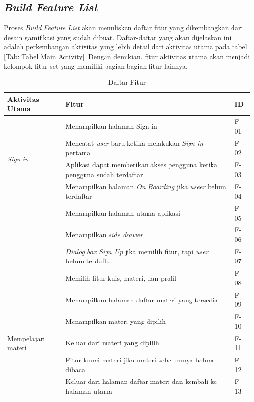 \subsection{\textit{Build Feature List}}
Proses \textit{Build Feature List} akan menuliskan daftar fitur yang dikembangkan dari desain gamifikasi yang sudah dibuat.
Daftar-daftar yang akan dijelaskan ini adalah perkembangan aktivitas yang lebih detail dari aktivitas utama pada tabel \ref*{Tab: Tabel Main Activity}.
Dengan demikian, fitur aktivitas utama akan menjadi kelompok fitur set yang memiliki bagian-bagian fitur lainnya.
\begin{table}[H]
	\centering
	\caption{Daftar Fitur}
	\begin{tabular}{|m{3cm}|p{}|m{1cm}|}
		\hline
		\centering\textbf{Aktivitas Utama} & \centering\textbf{Fitur} & \multicolumn{1}{m{1cm}|}{\centering \textbf{ID}} \\
		\hline
		\multirow{4}{2.5cm}{\textit{Sign-in}} &Menampilkan halaman Sign-in & F-01 \\
		\cline{2-3}
		 &Mencatat \textit{user} baru ketika melakukan \textit{Sign-in} pertama & F-02 \\
		\cline{2-3}
		 &Aplikasi dapat memberikan akses pengguna ketika pengguna sudah terdaftar& F-03 \\
		\hline
		\multirow{5}{2.5cm}{Melihat \textit{dashboard} halaman utama} &Menampilkan halaman \textit{On Boarding} jika \textit{useer} belum terdaftar & F-04 \\
		\cline{2-3}
		&Menampilkan halaman utama aplikasi& F-05 \\
		\cline{2-3}
		&Menampilkan \textit{side drawer}& F-06 \\
		\cline{2-3}
		&\textit{Dialog box Sign Up} jika memilih fitur, tapi \textit{user} belum terdaftar& F-07 \\
		\cline{2-3}
		&Memilih fitur kuis, materi, dan profil& F-08 \\
		\hline
		\multirow{6}{2.5cm}{Mempelajari materi} &Menampilkan halaman daftar materi yang tersedia& F-09 \\
		\cline{2-3}
		&Menampilkan materi yang dipilih & F-10 \\
		\cline{2-3}
		&Keluar dari materi yang dipilih& F-11 \\
		\cline{2-3}
		&Fitur kunci materi jika materi sebelumnya belum dibaca& F-12 \\
		\cline{2-3}
		&Keluar dari halaman daftar materi dan kembali ke halaman utama& F-13 \\

\end{tabular}
\end{table}
